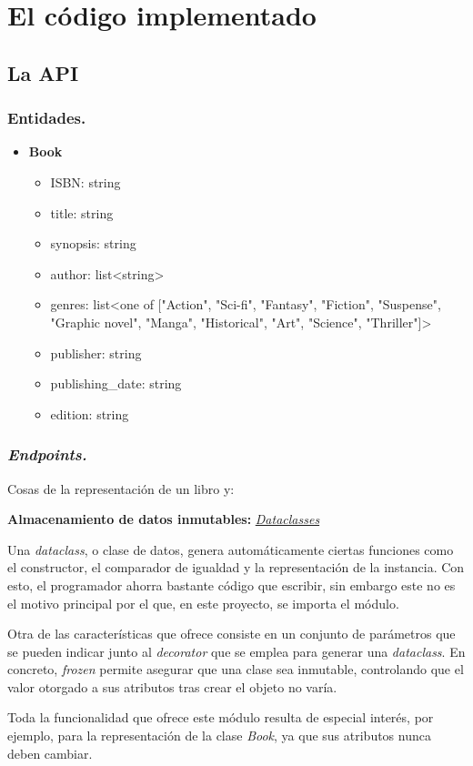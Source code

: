 \section{El código implementado}

\subsection{La API}

\subsubsection{Entidades.}

\begin{itemize}
    \item \textbf{Book}
    \begin{itemize}
        \item ISBN: string
        \item title: string
        \item synopsis: string
        \item author: list<string>
        \item genres: list<one of ["Action", "Sci-fi", "Fantasy", "Fiction", "Suspense", "Graphic novel", "Manga", "Historical", "Art", "Science", "Thriller"]>
        \item publisher: string
        \item publishing_date: string
        \item edition: string
    \end{itemize}
\end{itemize}

\subsubsection{\textit{Endpoints.}}



Cosas de la representación de un libro y:

\textbf{Almacenamiento de datos inmutables:} \href{https://docs.python.org/3/library/dataclasses.html}{\textit{Dataclasses}}

Una \textit{dataclass}, o clase de datos, genera automáticamente ciertas funciones como el constructor, el comparador de igualdad y la representación de la instancia. Con esto, el programador ahorra bastante código que escribir, sin embargo este no es el motivo principal por el que, en este proyecto, se importa el módulo.

Otra de las características que ofrece consiste en un conjunto de parámetros que se pueden indicar junto al \textit{decorator} que se emplea para generar una \textit{dataclass}. En concreto, \textit{frozen} permite asegurar que una clase sea inmutable, controlando que el valor otorgado a sus atributos tras crear el objeto no varía.

Toda la funcionalidad que ofrece este módulo resulta de especial interés, por ejemplo, para la representación de la clase \textit{Book}, ya que sus atributos nunca deben cambiar.